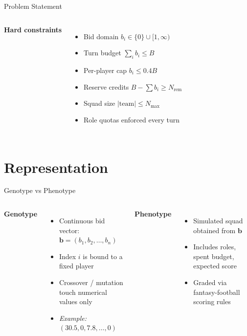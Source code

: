 \documentclass[aspectratio=169]{beamer}
\newcommand{\bids}{\mathbf{b}}
\begin{document}
\begin{frame}{Problem Statement}
\begin{columns}[T,onlytextwidth]
			\textbf{Hard constraints}
			\begin{itemize}
				\item Bid domain $b_i \in \{0\} \cup [1, \infty)$
				\item Turn budget $\sum_i b_i \le B$
				\item Per-player cap $b_i \le 0.4B$
				\item Reserve credits $B - \sum b_i \ge N_{\text{rem}}$
				\item Squad size $|\text{team}| \le N_{\max}$
				\item Role quotas enforced every turn
			\end{itemize}
			
		\end{columns}
	\end{frame}
	
	\section{Representation}
	\begin{frame}{Genotype vs Phenotype}
		\begin{columns}[T,onlytextwidth]
\textbf{Genotype}
\begin{itemize}
	\item Continuous bid vector: $\bids = (b_1, b_2, \dots, b_n)$
	\item Index \(i\) is bound to a fixed player
	\item Crossover / mutation touch numerical values only
	\item \textit{Example: } $(30.5, 0, 7.8, \dots, 0)$
\end{itemize}

			
			\textbf{Phenotype}
			\begin{itemize}
				\item Simulated squad obtained from \(\bids\)
				\item Includes roles, spent budget, expected score
				\item Graded via fantasy-football scoring rules
			\end{itemize}
		\end{columns}
	\end{frame}
	

	
\end{document}
